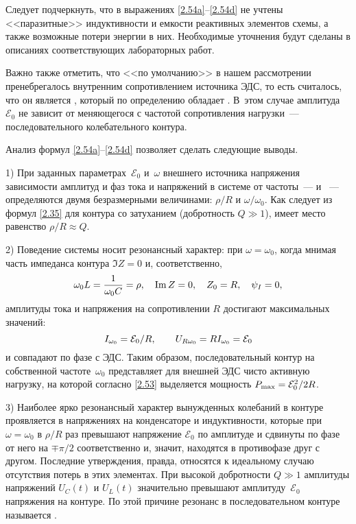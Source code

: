 Следует подчеркнуть, что в выражениях \eqref{2.54a}--\eqref{2.54d} не учтены
<<паразитные>> индуктивности и емкости реактивных элементов схемы, а также
возможные потери энергии в них. Необходимые уточнения будут сделаны в описаниях
соответствующих лабораторных работ.

Важно также отметить, что <<по умолчанию>> в нашем рассмотрении пренебрегалось
внутренним сопротивлением источника ЭДС, то есть считалось, что он является
, который по определению обладает
. В~этом случае амплитуда
$\mathcal{E}_0$ не зависит от меняющегося с частотой сопротивления
нагрузки~--- последовательного колебательного контура.

Анализ формул \eqref{2.54a}--\eqref{2.54d} позволяет сделать следующие выводы.

1) При заданных параметрах~$\mathcal{E}_0$ и~$\omega$ внешнего источника
напряжения зависимости амплитуд и фаз тока и напряжений в системе от
частоты~---  и ~--- определяются двумя безразмерными величинами: $\rho/R$ и
$\omega/\omega_0$. Как следует из формул \eqref{2.35} для контура
со  затуханием (добротность $Q\gg1$), имеет
место равенство $\rho/R\approx Q$.


2) Поведение системы носит резонансный характер: при $\omega=\omega_0$, когда
мнимая часть импеданса контура $\Im Z=0$ и, соответственно,
\begin{equation}\eqmark{2.55}
	\omega_0L=\frac{1}{\omega_0C}=\rho, \quad \Im Z=0, \quad Z_0 = R, \quad \psi_I = 0,
\end{equation}
амплитуды тока и напряжения на сопротивлении $R$ достигают максимальных значений:
\begin{equation}\eqmark{2.56}
	I_{\omega_0}=\mathcal{E}_0/R, \qquad
U_{R\omega_0}=RI_{\omega_0}=\mathcal{E}_0
\end{equation}
и совпадают по фазе с ЭДС. Таким образом, последовательный
контур на собственной частоте~$\omega_0$ представляет для внешней ЭДС чисто
активную нагрузку, на которой согласно \eqref{2.53} выделяется мощность
$P_{\rm max}=\mathcal{E}_0^2/2R$.

3) Наиболее ярко резонансный характер вынужденных колебаний в
 контуре проявляется в напряжениях на конденсаторе и
индуктивности, которые при $\omega=\omega_0$ в $\rho/R$ раз превышают напряжение
$\mathcal{E}_0$ по амплитуде и сдвинуты по фазе от него на $\mp\pi/2$
соответственно и, значит, находятся в противофазе друг с другом. Последние
утверждения, правда, относятся к идеальному случаю отсутствия потерь в этих
элементах. При высокой добротности $Q\gg1$ амплитуды напряжений $U_C(t)$ и
$U_L(t)$ значительно превышают амплитуду~$\mathcal{E}_0$ напряжения на контуре.
По этой причине резонанс в последовательном контуре называется
.

